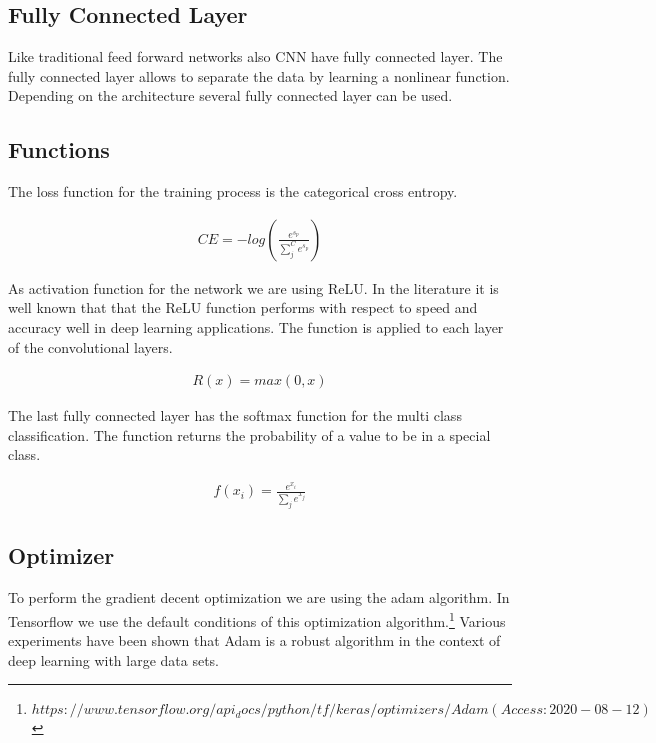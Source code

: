 \documentclass[11pt, a4paper]{article}
\begin{document}
\subsection{Fully Connected Layer}
Like traditional feed forward networks also CNN have fully connected layer. The fully connected layer allows to separate the data by learning a nonlinear function. Depending on the architecture several fully connected layer can be used.\cite[p.~327 - 328]{nndl}

\subsection{Functions}
The loss function for the training process is the categorical cross entropy.

\begin{center}
\begin{eqnarray}
CE = -log(\frac{e^{s_{p}}}{\sum_{j}^{C}e^{s_{p}}})
\end{eqnarray}
\label{formula: ce}
\end{center}

As activation function for the network we are using ReLU. In the literature it is well known that that the ReLU function performs with respect to speed and accuracy well in deep learning applications. The function is applied to each layer of the convolutional layers.\cite[p. 325]{nndl} 
\begin{center}
\begin{eqnarray}
R(x) = max(0, x)
\end{eqnarray}
\label{formula: relu}
\end{center}

The last fully connected layer has the softmax function for the multi class classification. The function returns the probability of a value to be in a special class.\cite[p. 8]{softmax_func}
\begin{center}
\begin{eqnarray}
f(x_{i}) = \frac{e^{x_{i}}}{\sum_{j}^{}e^{x_{j}}}
\end{eqnarray}
\label{formula: softmax}
\end{center}

\subsection{Optimizer}
To perform the gradient decent optimization we are using the adam algorithm. In Tensorflow we use the default conditions of this optimization algorithm.\footnote{$https://www.tensorflow.org/api_docs/python/tf/keras/optimizers/Adam (Access: 2020-08-12)$} Various experiments have been shown that Adam is a robust algorithm in the context of deep learning with large data sets.\cite{adam} 
\end{document}
